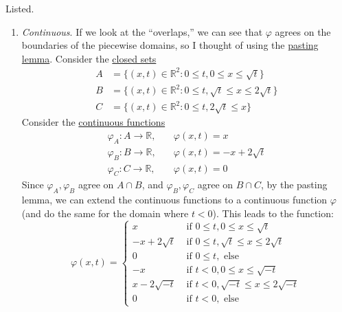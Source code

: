 	\begin{solution}
	  Listed. 
		\begin{enumerate}
			\item \textit{Continuous}. If we look at the ``overlaps,'' we can see that $\varphi$ agrees on the boundaries of the piecewise domains, so I thought of using the \hyperref[pst-thm:pasting_lemma]{pasting lemma}. Consider the \hyperref[pst-def:closed]{closed sets} 
				\begin{align}
					A & = \{(x, t) \in \mathbb{R}^2 \colon 0 \leq t, 0 \leq x \leq \sqrt{t} \} \\ 
					B & = \{(x, t) \in \mathbb{R}^2 \colon 0 \leq t, \sqrt{t} \leq x \leq 2 \sqrt{t} \} \\ 
					C & = \{(x, t) \in \mathbb{R}^2 \colon 0 \leq t, 2 \sqrt{t} \leq x \}
				\end{align}
				Consider the \hyperref[pst-def:continuous_func]{continuous functions} 
				\begin{align}
					\varphi_A : A \to \mathbb{R}, \quad & \varphi(x, t) = x \\ 
					\varphi_B : B \to \mathbb{R}, \quad & \varphi(x, t) = -x + 2 \sqrt{t} \\ 
					\varphi_C : C \to \mathbb{R}, \quad & \varphi(x, t) = 0 
				\end{align}
				Since $\varphi_A, \varphi_B$ agree on $A \cap B$, and $\varphi_B, \varphi_C$ agree on $B \cap C$, by the pasting lemma, we can extend the continuous functions to a continuous function $\varphi$ (and do the same for the domain where $t < 0$). This leads to the function: 
				\begin{equation}
					\varphi(x, t) = \begin{cases} 
						x & \text{ if } 0 \leq t, 0 \leq x \leq \sqrt{t} \\ 
						-x + 2\sqrt{t} & \text{ if } 0 \leq t, \sqrt{t} \leq x \leq 2 \sqrt{t} \\ 
						0 & \text{ if } 0 \leq t, \text{ else} \\ 
						-x & \text{ if } t < 0, 0 \leq x \leq \sqrt{-t} \\ 
						x - 2\sqrt{-t} & \text{ if } t < 0, \sqrt{-t} \leq x \leq 2 \sqrt{-t} \\ 
						0 & \text{ if } t < 0, \text{ else}
					\end{cases}
				\end{equation}


\end{enumerate}
\end{solution}
